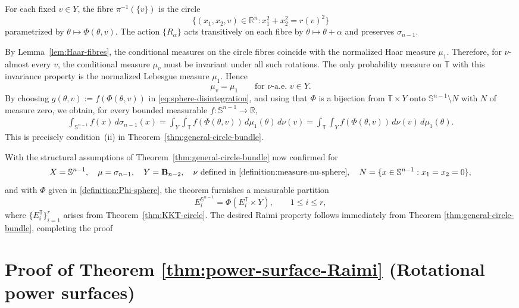 \documentclass[11pt]{article}
\numberwithin{equation}{section}
\theoremstyle{remark}
\begin{document}
For each fixed $v\in Y$, the fibre $\pi^{-1}(\{v\})$ is the circle
\[
\{(x_1,x_2,v)\in\mathbb{R}^n : x_1^2+x_2^2=r(v)^2\}
\]
parametrized by $\theta\mapsto\Phi(\theta,v)$. The action $\{R_\alpha\}$ acts transitively on each fibre by $\theta\mapsto\theta+\alpha$ and preserves $\sigma_{n-1}$.

 By Lemma~\ref{lem:Haar-fibres}, the conditional measures on the circle fibres coincide with the normalized Haar measure $\mu_1$. Therefore, for $\nu$-almost every $v$, the conditional measure $\mu_v$ must be invariant under all such rotations.
The only probability measure on $\mathbb{T}$ with this invariance property is the normalized Lebesgue measure $\mu_1$. Hence
\[
\mu_v = \mu_1\qquad\text{for $\nu$-a.e. }v\in Y.
\]
By choosing \(g(\theta,v):=f(\Phi(\theta,v))\) in
\eqref{eq:sphere-disintegration}, and using that \(\Phi\) is a bijection from \(\mathbb{T}\times Y\) onto
\(\mathbb{S}^{n-1}\setminus N\) with \(N\) of measure zero, we obtain, for every bounded measurable $f:\mathbb{S}^{n-1}\to\mathbb{R}$,
\begin{align*}
\int_{\mathbb{S}^{n-1}} f(x)\,d\sigma_{n-1}(x)
= \int_Y\int_\mathbb{T} f(\Phi(\theta,v))\,d\mu_1(\theta)\,d\nu(v)= \int_\mathbb{T} \int_Y f(\Phi(\theta,v))\,d\nu(v)\,d\mu_1(\theta).
\end{align*}
This is precisely condition~(ii) in Theorem~\ref{thm:general-circle-bundle}.

\medskip\noindent
With the structural assumptions of Theorem~\ref{thm:general-circle-bundle} now confirmed for 
\[
X=\mathbb{S}^{n-1},\quad 
\mu=\sigma_{n-1},\quad
Y=\mathbf{B}_{n-2},\quad
\nu \text{ defined in \eqref{definition:measure-nu-sphere}},\quad
N=\{x\in\mathbb{S}^{n-1}: x_1=x_2=0\},
\]
and with $\Phi$ given in \eqref{definition:Phi-sphere}, the theorem furnishes a measurable partition
\[
E_i^{\mathbb{S}^{n-1}}
   =\Phi(E_i^\mathbb{T}\times Y),\qquad 1\le i\le r,
\]
where \(\{E_i^\mathbb{T} \}_{i=1}^r\) arises from Theorem~\ref{thm:KKT-circle}. 
The desired Raimi property follows immediately from Theorem \ref{thm:general-circle-bundle}, completing the proof



\section{Proof of Theorem \ref{thm:power-surface-Raimi} (Rotational power surfaces)}\label{section-power-surface}
\end{document}
